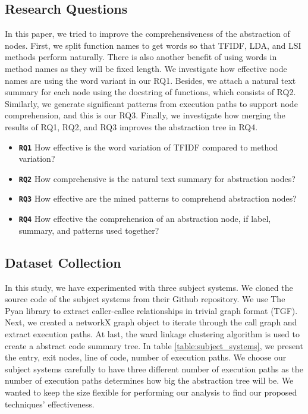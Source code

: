\subsection{Research Questions}
In this paper, we tried to improve the comprehensiveness of the abstraction of nodes. First, we split function names to get words so that TFIDF, LDA, and LSI methods perform naturally. There is also another benefit of using words in method names as they will be fixed length. We investigate how effective node names are using the word variant in our RQ1. Besides, we attach a natural text summary for each node using the docstring of functions, which consists of RQ2. Similarly, we generate significant patterns from execution paths to support node comprehension, and this is our RQ3. Finally, we investigate how merging the results of RQ1, RQ2, and RQ3 improves the abstraction tree in RQ4. 

\begin{itemize}
    
    \item \textbf{\texttt{RQ1}} How effective is the word variation of TFIDF compared to method variation?
    \item \textbf{\texttt{RQ2}} How comprehensive is the natural text summary for abstraction nodes?
    \item \textbf{\texttt{RQ3}} How effective are the mined patterns to comprehend abstraction nodes?
    \item \textbf{\texttt{RQ4}} How effective the comprehension of an abstraction node, if label, summary, and patterns used together?
\end{itemize}

\subsection{Dataset Collection}
In this study, we have experimented with three subject systems. We cloned the source code of the subject systems from their Github repository. We use The Pyan library to extract caller-callee relationships in trivial graph format (TGF). Next, we created a networkX graph object to iterate through the call graph and extract execution paths. At last, the ward linkage clustering algorithm is used to create a abstract code summary tree. In table \ref{table:subject_systems}, we present the entry, exit nodes, line of code, number of execution paths. We choose our subject systems carefully to have three different number of execution paths as the number of execution paths determines how big the abstraction tree will be. We wanted to keep the size flexible for performing our analysis to find our proposed techniques' effectiveness. 

